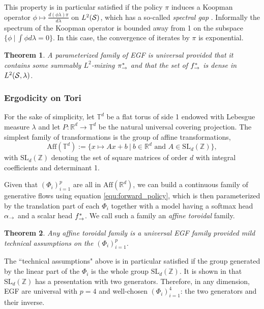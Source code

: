 \documentclass{article}
\theoremstyle{plain}
\newtheorem{theorem}{Theorem}[section]
\theoremstyle{definition}
\theoremstyle{remark}
\theoremstyle{fact}
\begin{document}
This property is in particular satisfied if the policy $\pi$ induces a Koopman operator $\phi \mapsto \frac{d (\phi\lambda)\pi}{d\lambda}$ on $L^2(\mathcal S)$, which has a so-called {\it spectral gap} \cite{conze2013ergodicity}. Informally the spectrum of the Koopman operator is bounded away from 1 on the subspace $\{\phi~|~\int \phi d\lambda =0\}$. 
In this case, the convergence of iterates by $\pi$ is exponential.


\begin{theorem} \label{theo:universality}A parameterized family  of EGF is universal provided  that it contains some summably $L^2$-mixing $\pi_{\rightarrow}^*$  and that the set of $f^*_{\rightarrow}$ is dense in $L^2(\mathcal S,\lambda)$.
\end{theorem}

\subsubsection{Ergodicity on Tori}
\label{sec:universality_tori}
For the sake of simplicity, let $\mathbb T^d$ be a flat torus of side 1 endowed with Lebesgue measure $\lambda$ and let $P:\mathbb R^d \rightarrow \mathbb T^d$ be the natural universal covering projection. The simplest family of transformations is the group of affine transformations,
\begin{equation}\mathrm{Aff}(\mathbb T^d) :=
\{x\mapsto Ax+b ~|~ b\in \mathbb R^d \text{ and } A\in \mathrm{SL}_d(\mathbb Z)\},
\end{equation}
with $ \mathrm{SL}_d(\mathbb Z)$ denoting the set of square matrices of order $d$ with integral coefficients and determinant 1. 

Given that $(\Phi_i)_{i=1}^p$ are all in $\mathrm{Aff}(\mathbb R^d)$, we can build a continuous family of generative flows using equation \eqref{equ:forward_policy}, which is then parameterized by the translation part of each $\Phi_i$ together with  a model having a softmax head $\alpha_{\rightarrow}$ and a scalar head $f^*_{\rightarrow}$. We call such a family an {\it affine toroidal} family.


\begin{theorem}\label{theo:universality_tori} Any affine toroidal family is a universal EGF family provided mild technical assumptions on the $(\Phi_i)_{i=1}^p$.
\end{theorem}
The ``technical assumptions" above is in particular satisfied if the group generated by the linear part of the $\Phi_i$ is the whole group $\mathrm{SL}_d(\mathbb Z)$. It is shown in \citet{conder2025generating} that $\mathrm{SL}_d(\mathbb Z)$ has a presentation with two generators. Therefore, in any dimension, EGF are universal with $p=4$ and well-chosen $(\Phi_i)_{i=1}^4$: the two generators and their inverse.
\end{document}
